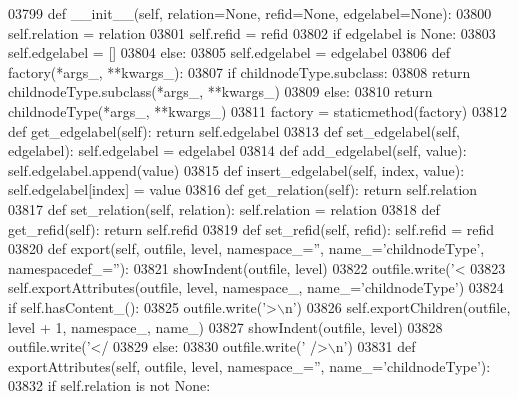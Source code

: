 \begin{DoxyCode}
{{{{{{{{{{{{{{{{{{{{{{{{{{{{{{{{{{{{{{{{{{{{{{{{{{{{{{{{{{{{{{{{{{{{{{{{{{{{{{{{{{{{{{{{{{{{{{{{{{{{{{{{{{{{{{{{{{{{{{{{{{{{{{{{{{{{{{{{{{{{{{{{{{{{{{{{{{{{{{{{{{{{{{{{{{{{{{{{{{{{{{{{{{{{{{{{{{{{{{{{{{{{{{{{{{{{{{{{{{{{{{{{{{{{{{{{{{{{{{{{{{{03799     \textcolor{keyword}{def }__init__(self, relation=None, refid=None, edgelabel=None):
03800         self.relation = relation
03801         self.refid = refid
03802         \textcolor{keywordflow}{if} edgelabel \textcolor{keywordflow}{is} \textcolor{keywordtype}{None}:
03803             self.edgelabel = []
03804         \textcolor{keywordflow}{else}:
03805             self.edgelabel = edgelabel
03806     \textcolor{keyword}{def }factory(*args\_, **kwargs\_):
03807         \textcolor{keywordflow}{if} childnodeType.subclass:
03808             \textcolor{keywordflow}{return} childnodeType.subclass(*args\_, **kwargs\_)
03809         \textcolor{keywordflow}{else}:
03810             \textcolor{keywordflow}{return} childnodeType(*args\_, **kwargs\_)
03811     factory = staticmethod(factory)
03812     \textcolor{keyword}{def }get_edgelabel(self): \textcolor{keywordflow}{return} self.edgelabel
03813     \textcolor{keyword}{def }set_edgelabel(self, edgelabel): self.edgelabel = edgelabel
03814     \textcolor{keyword}{def }add_edgelabel(self, value): self.edgelabel.append(value)
03815     \textcolor{keyword}{def }insert_edgelabel(self, index, value): self.edgelabel[index] = value
03816     \textcolor{keyword}{def }get_relation(self): \textcolor{keywordflow}{return} self.relation
03817     \textcolor{keyword}{def }set_relation(self, relation): self.relation = relation
03818     \textcolor{keyword}{def }get_refid(self): \textcolor{keywordflow}{return} self.refid
03819     \textcolor{keyword}{def }set_refid(self, refid): self.refid = refid
03820     \textcolor{keyword}{def }export(self, outfile, level, namespace\_='', name\_='childnodeType', namespacedef\_=''):
03821         showIndent(outfile, level)
03822         outfile.write(\textcolor{stringliteral}{'<%
03823         self.exportAttributes(outfile, level, namespace\_, name\_=\textcolor{stringliteral}{'childnodeType'})
03824         \textcolor{keywordflow}{if} self.hasContent_():
03825             outfile.write(\textcolor{stringliteral}{'>\(\backslash\)n'})
03826             self.exportChildren(outfile, level + 1, namespace\_, name\_)
03827             showIndent(outfile, level)
03828             outfile.write(\textcolor{stringliteral}{'</%
03829         \textcolor{keywordflow}{else}:
03830             outfile.write(\textcolor{stringliteral}{' />\(\backslash\)n'})
03831     \textcolor{keyword}{def }exportAttributes(self, outfile, level, namespace\_='', name\_='childnodeType'):
03832         \textcolor{keywordflow}{if} self.relation \textcolor{keywordflow}{is} \textcolor{keywordflow}{not} \textcolor{keywordtype}{None}:
}}}}}}}}}}}}}}}}}}}}}}}}}}}}}}}}}}}}}}}}}}}}}}}}}}}}}}}}}}}}}}}}}}}}}}}}}}}}}}}}}}}}}}}}}}}}}}}}}}}}}}}}}}}}}}}}}}}}}}}}}}}}}}}}}}}}}}}}}}}}}}}}}}}}}}}}}}}}}}}}}}}}}}}}}}}}}}}}}}}}}}}}}}}}}}}}}}}}}}}}}}}}}}}}}}}}}}}}}}}}}}}}}}}}}}}}}}}}}}}}}}}}}
\end{DoxyCode}
